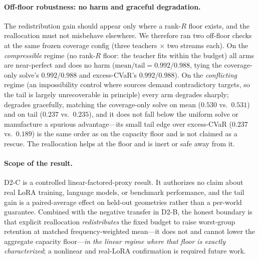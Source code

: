 \paragraph{Off-floor robustness: no harm and graceful degradation.}
The redistribution gain should appear only where a rank-$R$ floor exists, and the
reallocation must not misbehave elsewhere. We therefore ran two off-floor checks
at the same frozen coverage config (three teachers $\times$ two streams each). On
the \emph{compressible} regime (no rank-$R$ floor: the teacher fits within the
budget) all arms are near-perfect and \method{} does no harm
($\mathrm{mean}/\mathrm{tail}=0.992/0.988$, tying the coverage-only solve's
$0.992/0.988$ and excess-CVaR's $0.992/0.988$). On the \emph{conflicting} regime
(an impossibility control where sources demand contradictory targets, so the tail
is largely unrecoverable in principle) every arm degrades sharply; \method{}
degrades gracefully, matching the coverage-only solve on mean ($0.530$ vs.\
$0.531$) and on tail ($0.237$ vs.\ $0.235$), and it does not fall below the
uniform solve or manufacture a spurious advantage---its small tail edge over
excess-CVaR ($0.237$ vs.\ $0.189$) is the same order as on the capacity floor and
is not claimed as a rescue. The reallocation helps at the floor and is inert or
safe away from it.

\paragraph{Scope of the \method{} result.}
D2-C is a controlled linear-factored-proxy result. It authorizes no claim about
real LoRA training, language models, or benchmark performance, and the tail gain
is a paired-average effect on held-out geometries rather than a per-world
guarantee. Combined with the negative transfer in D2-B, the honest boundary is
that explicit reallocation \emph{redistributes} the fixed budget to raise
worst-group retention at matched frequency-weighted mean---it does not and cannot
lower the aggregate capacity floor---\emph{in the linear regime where that floor
is exactly characterized}; a nonlinear and real-LoRA confirmation is required
future work.
